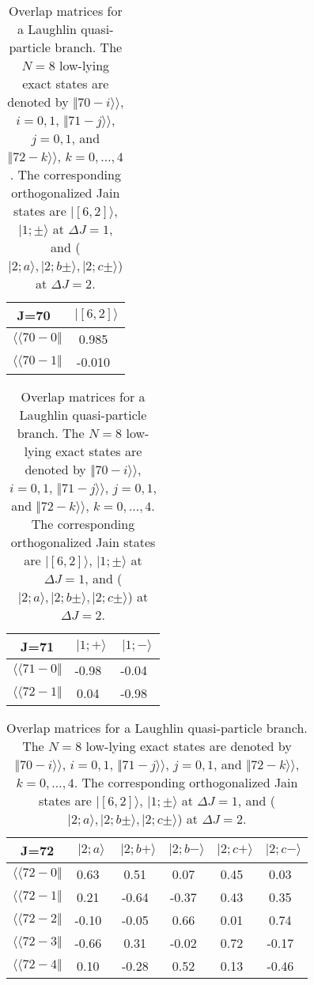 \begin{table}
\caption{Overlap matrices for a Laughlin quasi-particle branch.
The $N=8$ low-lying exact states are denoted by
$\Vert 70-i \rangle\rangle$, $i=0,1$, 
$\Vert 71-j \rangle\rangle$, $j=0,1$, and 
$\Vert 72-k \rangle\rangle$, $k=0,\dots,4$. 
The corresponding orthogonalized Jain states are
$\vert [6,2]\rangle$, $\vert 1;\pm\rangle$ at $\Delta J=1$, and
($\vert 2;a\rangle,\vert2;b\pm\rangle,\vert 2;c\pm\rangle$) at $\Delta J=2$.} 
\label{tab20}
\vspace{0.2cm}
\begin{center}
\begin{tabular}{|c|c|} 
\hline
J=70\  & $\vert [6,2] \rangle$  \\ 
\hline
$\langle\langle 70-0\Vert$  & 0.985\ \\ 
$\langle\langle 70-1\Vert$  & -0.010\ \\
\end{tabular}
\begin{tabular}{|c|c|c|} 
J=71    & $\vert 1; +\rangle$  & $\vert 1;-\rangle$  \\ 
\hline
$\langle\langle 71-0\Vert$ & -0.98\ & -0.04\  \\
$\langle\langle 72-1\Vert$ &  0.04\ & -0.98\  \\
\end{tabular}
\begin{tabular}{|c|c|c|c|c|c|} 
J=72 & $\vert 2;a\rangle$ & $\vert 2;b+\rangle$ & $\vert 2;b-\rangle$ &
$\vert 2;c+\rangle$ & $\vert 2;c-\rangle$ \\
\hline
$\langle\langle 72-0\Vert$ & 0.63\ & 0.51\ & 0.07\ & 0.45\ & 0.03\ \\
$\langle\langle 72-1\Vert$ & 0.21\ &-0.64\ &-0.37\ & 0.43\ & 0.35\ \\
$\langle\langle 72-2\Vert$ &-0.10\ &-0.05\ & 0.66\ & 0.01\ & 0.74\ \\
$\langle\langle 72-3\Vert$ &-0.66\ & 0.31\ &-0.02\ & 0.72\ &-0.17\ \\
$\langle\langle 72-4\Vert$ & 0.10\ &-0.28\ & 0.52\ & 0.13\ &-0.46\ \\
\hline
\end{tabular}
\end{center}
\end{table}


